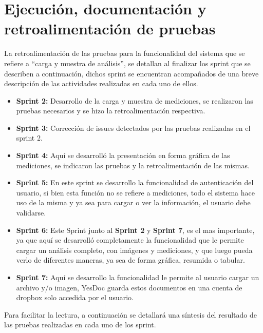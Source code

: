 \section{Ejecución, documentación y retroalimentación de pruebas}
 La retroalimentación de las pruebas para la funcionalidad del sistema que se refiere a ``carga y muestra de análisis'', se detallan al finalizar los sprint que se describen a continuación, dichos sprint se encuentran acompañados de una breve descripción de las actividades realizadas en cada uno de ellos.
 \begin{itemize}
 	\item \textbf{Sprint 2:} Desarrollo de la carga y muestra de mediciones, se realizaron las pruebas necesarios y se hizo la retroalimentación respectiva.
 	\item \textbf{Sprint 3:} Corrección de issues detectados por las pruebas realizadas en el sprint 2.
 	\item \textbf{Sprint 4:} Aquí se desarrolló la presentación en forma gráfica de las mediciones, se indicaron las pruebas y la retroalimentación de las mismas.
 	\item \textbf{Sprint 5:} En este sprint se desarrollo la funcionalidad de autenticación del usuario, si bien esta función no se refiere a mediciones, todo el sistema hace uso de la misma y ya sea para cargar o ver la información, el usuario debe validarse.
 	\item \textbf{Sprint 6: } Este Sprint junto al \textbf{Sprint 2} y \textbf{Sprint 7}, es el mas importante, ya que aquí se desarrolló completamente la funcionalidad que le permite cargar un análisis completo, con imágenes y mediciones,  y que luego pueda verlo de diferentes maneras, ya sea de forma gráfica, resumida o tabular.
 	\item \textbf{Sprint 7: } Aquí se desarrollo la funcionalidad le permite al usuario cargar un archivo y/o imagen, YesDoc guarda estos documentos en una cuenta de dropbox solo accedida por el usuario.
 \end{itemize}
 
 Para facilitar la lectura, a continuación se detallará una síntesis del resultado de las pruebas realizadas en cada uno de los sprint.
 
